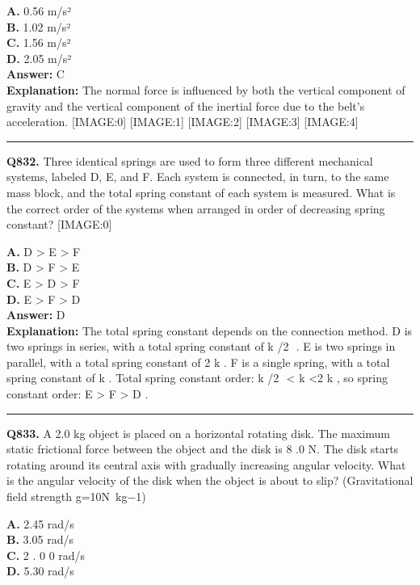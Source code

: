 \documentclass[12pt]{article}
\begin{document}
\textbf{A.} 0.56 m/s² \\
\textbf{B.} 1.02 m/s² \\
\textbf{C.} 1.56 m/s² \\
\textbf{D.} 2.05 m/s² \\

\textbf{Answer:} C \\
\textbf{Explanation:} The normal force is influenced by both the vertical component of gravity and the vertical component of the inertial force due to the belt's acceleration.
[IMAGE:0]
[IMAGE:1]
[IMAGE:2]
[IMAGE:3]
[IMAGE:4]

\hrule
\vspace{1em}


\noindent
\textbf{Q832.} Three identical springs are used to form three different mechanical systems, labeled D, E, and F. Each system is connected, in turn, to the same mass block, and the total spring constant of each system is measured. What is the correct order of the systems when arranged in order of
decreasing
spring constant?
[IMAGE:0]



\textbf{A.} D
>
E
>
F \\
\textbf{B.} D
>
F
>
E \\
\textbf{C.} E
>
D
>
F \\
\textbf{D.} E
>
F
>
D \\

\textbf{Answer:} D \\
\textbf{Explanation:} The total spring constant depends on the connection method.
\cdot 
D is two springs in series, with a total spring constant of
k
/2
​
.
\cdot 
E is two springs in parallel, with a total spring constant of 2
k
.
\cdot 
F is a single spring, with a total spring constant of
k
.
Total spring constant order:
k
/2
​
<
k
<2
k
, so spring constant order:
E > F > D
.

\hrule
\vspace{1em}


\noindent
\textbf{Q833.} A 2.0 kg object is placed on a horizontal rotating disk. The maximum static frictional force between the object and the disk is
8
.0 N. The disk starts rotating around its central axis with gradually increasing angular velocity. What is the angular velocity of the disk when the object is about to slip? (Gravitational field strength g=10N kg−1)



\textbf{A.} 2.45 rad/s \\
\textbf{B.} 3.05 rad/s \\
\textbf{C.} 2
.
0
0 rad/s \\
\textbf{D.} 5.30 rad/s \\
\end{document}
